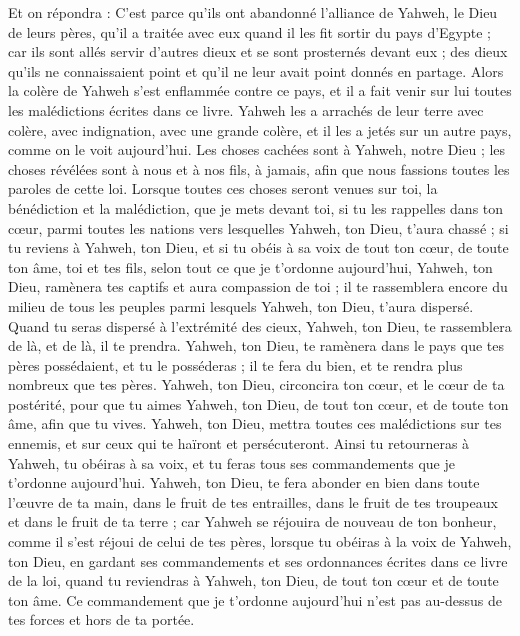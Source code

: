 \begin{multicols}{2}
Et on répondra : C'est parce qu'ils ont abandonné l'alliance de Yahweh, le Dieu de leurs pères, qu’il a traitée avec eux quand il les fit sortir du pays d'Egypte ;
car ils sont allés servir d'autres dieux et se sont prosternés devant eux ; des dieux qu'ils ne connaissaient point et qu’il ne leur avait point donnés en partage.
Alors la colère de Yahweh s'est enflammée contre ce pays, et il a fait venir sur lui toutes les malédictions écrites dans ce livre.
Yahweh les a arrachés de leur terre avec colère, avec indignation, avec une grande colère, et il les a jetés sur un autre pays, comme on le voit aujourd'hui.
Les choses cachées sont à Yahweh, notre Dieu ; les choses révélées sont à nous et à nos fils, à jamais, afin que nous fassions toutes les paroles de cette loi.
\VerseOne{}Lorsque toutes ces choses seront venues sur toi, la bénédiction et la malédiction, que je mets devant toi, si tu les rappelles dans ton cœur, parmi toutes les nations vers lesquelles Yahweh, ton Dieu, t'aura chassé ;
si tu reviens à Yahweh, ton Dieu, et si tu obéis à sa voix de tout ton cœur, de toute ton âme, toi et tes fils, selon tout ce que je t’ordonne aujourd’hui,
Yahweh, ton Dieu, ramènera tes captifs et aura compassion de toi ; il te rassemblera encore du milieu de tous les peuples parmi lesquels Yahweh, ton Dieu, t'aura dispersé.
Quand tu seras dispersé à l’extrémité des cieux, Yahweh, ton Dieu, te rassemblera de là, et de là, il te prendra.
Yahweh, ton Dieu, te ramènera dans le pays que tes pères possédaient, et tu le posséderas ; il te fera du bien, et te rendra plus nombreux que tes pères.
Yahweh, ton Dieu, circoncira ton cœur, et le cœur de ta postérité, pour que tu aimes Yahweh, ton Dieu, de tout ton cœur, et de toute ton âme, afin que tu vives.
Yahweh, ton Dieu, mettra toutes ces malédictions sur tes ennemis, et sur ceux qui te haïront et persécuteront.
Ainsi tu retourneras à Yahweh, tu obéiras à sa voix, et tu feras tous ses commandements que je t’ordonne aujourd'hui.
Yahweh, ton Dieu, te fera abonder en bien dans toute l’œuvre de ta main, dans le fruit de tes entrailles, dans le fruit de tes troupeaux et dans le fruit de ta terre ; car Yahweh se réjouira de nouveau de ton bonheur, comme il s'est réjoui de celui de tes pères,
lorsque tu obéiras à la voix de Yahweh, ton Dieu, en gardant ses commandements et ses ordonnances écrites dans ce livre de la loi, quand tu reviendras à Yahweh, ton Dieu, de tout ton cœur et de toute ton âme.
Ce commandement que je t’ordonne aujourd'hui n'est pas au-dessus de tes forces et hors de ta portée.

\end{multicols}
